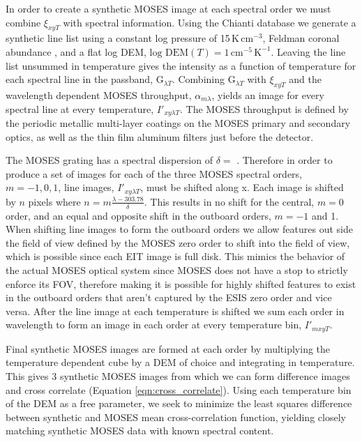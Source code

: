 		In order to create a synthetic MOSES image at each spectral order we must combine $\xi_{xyT}$ with spectral information.
		Using the Chianti database we generate a synthetic line list using a constant log pressure of 15\,K\,cm$^{-3}$, Feldman coronal abundance \citep{FeldmanAbund}, and a flat log DEM, $\text{log DEM}(T) = 1\,\text{cm}^{-5}\,\text{K}^{-1}$.
		Leaving the line list unsummed in temperature gives the intensity as a function of temperature for each spectral line in the passband, G$_{\lambda T}$.
		Combining G$_{\lambda T}$ with $\xi_{xyT}$ and the wavelength dependent MOSES throughput, $\alpha_{m\lambda}$, yields an image for every spectral line at every temperature, $I'_{xy\lambda T}$.
		The MOSES throughput is defined by the periodic metallic multi-layer coatings on the MOSES primary and secondary optics, as well as the thin film aluminum filters just before the detector.
		
		The MOSES grating has a spectral dispersion of $\delta =$ \spectdisperspix.
		Therefore in order to produce a set of images for each of the three MOSES spectral orders, $m = -1,0,1$, line images, $I'_{xy\lambda T}$, must be shifted along x.
		Each image is shifted by $n$ pixels where $n = m\frac{\lambda - 303.78}{\delta}$.
		This results in no shift for the central, $m = 0$ order, and an equal and opposite shift in the outboard orders, $m = -1$ and 1.
		When shifting line images to form the outboard orders we allow features out side the field of view defined by the MOSES zero order to shift into the field of view, which is possible since each EIT image is full disk.
		This mimics the behavior of the actual MOSES optical system since MOSES does not have a stop to strictly enforce its FOV, therefore making it is possible for highly shifted features to exist in the outboard orders that aren't captured by the ESIS zero order and vice versa.
		After the line image at each temperature is shifted we sum each order in wavelength to form an image in each order at every temperature bin, $I'_{mxyT}$.
		     	
		Final synthetic MOSES images are formed at each order by multiplying the temperature dependent cube by a DEM of choice and integrating in temperature.
		This gives 3 synthetic MOSES images from which we can form difference images and cross correlate (Equation \ref{eqn:cross_correlate}).
		Using each temperature bin of the DEM as a free parameter, we seek to minimize the least squares difference between synthetic and MOSES mean cross-correlation function, yielding closely matching synthetic MOSES data with known spectral content.
		
